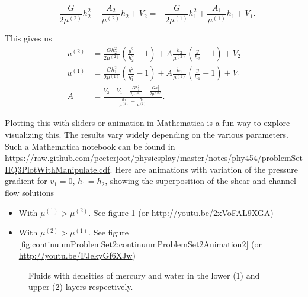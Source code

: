 \begin{equation}\label{eqn:continuumProblemSet2:900}
-\frac{G}{2 \mu^{(2)}}h_2^2 - \frac{A_2}{\mu^{(2)}} h_2 + V_2 = -\frac{G}{2 \mu^{(1)}}h_1^2 + \frac{A_1}{\mu^{(1)}} h_1 + V_1.
\end{equation}

This gives us
\begin{align}\label{eqn:continuumProblemSet2:920}
u^{(2)} &= \frac{G h_2^2}{2 \mu^{(2)}}\left(\frac{y^2}{h_2^2} - 1 \right) + A \frac{ h_2}{\mu^{(2)}} \left( \frac{y}{h_2} - 1 \right) + V_2 \\
u^{(1)} &= \frac{G h_1^2}{2 \mu^{(1)}}\left(\frac{y^2}{h_1^2} - 1 \right) + A \frac{ h_1}{\mu^{(1)}} \left( \frac{y}{h_1} + 1 \right) + V_1 \\
A 
&=
\frac{
V_2 - V_1
+ 
\frac{G h_1^2}{2 \mu^{(1)}}
-\frac{G h_2^2}{2 \mu^{(2)}}
}{
\frac{h_1}{\mu^{(1)}}
+\frac{h_2}{\mu^{(2)}}
}.
\end{align}

Plotting this with sliders or animation in Mathematica is a fun way to explore visualizing this.  The results vary widely depending on the various parameters.  Such a Mathematica notebook can be found in \href{https://raw.github.com/peeterjoot/physicsplay/master/notes/phy454/problemSetIIQ3PlotWithManipulate.cdf}{https://raw.github.com/peeterjoot/physicsplay/master/notes/phy454/problemSetIIQ3PlotWithManipulate.cdf}.  Here are animations with variation of the pressure gradient for $v_1 = 0$, $h_1 = h_2$, showing the superposition of the shear and channel flow solutions

\begin{itemize}
\item With $\mu^{(1)} > \mu^{(2)}$.  See figure \ref{fig:continuumProblemSet2:continuumProblemSet2Animation1} (or \href{http://youtu.be/2xVoFAL9XGA}{http://youtu.be/2xVoFAL9XGA})

\item With $\mu^{(2)} > \mu^{(1)}$.  See figure \ref{fig:continuumProblemSet2:continuumProblemSet2Animation2} (or \href{http://youtu.be/FJekyGf6XJw}{http://youtu.be/FJekyGf6XJw})
\end{itemize}

\begin{figure}[htp]
   \centering
{}
   \caption{Fluids with densities of mercury and water in the lower (1) and upper (2) layers respectively.}
   \label{fig:continuumProblemSet2:continuumProblemSet2Animation1}
\end{figure}

